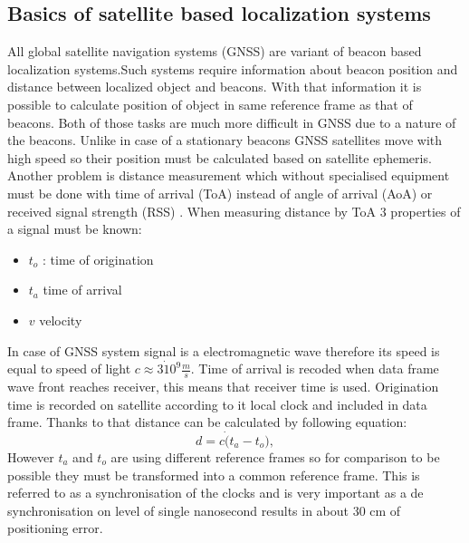 \documentclass{kybernetika}
\begin{document}
\subsection{Basics of satellite based localization systems}
All global satellite navigation systems (GNSS) are variant of beacon based localization
systems\cite{Blewitt1997}.Such systems require information about beacon position
and distance between localized object and beacons.
With that information it is possible to calculate position of object in same reference
frame as that of beacons.
Both of those tasks are much more difficult in GNSS due to a nature of the beacons.
Unlike in case of a stationary beacons GNSS satellites move with high speed so
their position must be calculated based on satellite ephemeris\cite{Vallado2008}.
Another problem is distance measurement which without specialised equipment must be
done with time of arrival (ToA) instead of angle of arrival (AoA) or
received signal strength (RSS) \cite{Doberstein2012}.
When measuring distance by ToA  3 properties of a signal must be known:
\begin{itemize}
\item $t_o$ : time of origination
\item $t_a$ time of arrival
\item $v$ velocity
\end{itemize}
In case of GNSS system signal is a electromagnetic wave therefore its speed is equal
to speed of light $c\approx 3\dot 10^{9} \frac{m}{s}$. Time of arrival is recoded when
data frame wave front reaches receiver, this means that receiver time is used.
Origination time is recorded on satellite according to it local clock and
included in data frame. Thanks to that distance can be calculated by following 
equation:
\begin{equation}
  d=c\dot (t_a-t_o),
\end{equation}
However $t_a$ and $t_o$ are using different reference frames so for comparison
to be possible they must be transformed into a common reference frame.
This is referred to as a synchronisation of the clocks and is very important as
a de synchronisation on level of single nanosecond results in about 30 cm of
positioning error\cite{Enge2011}.

\end{document}
